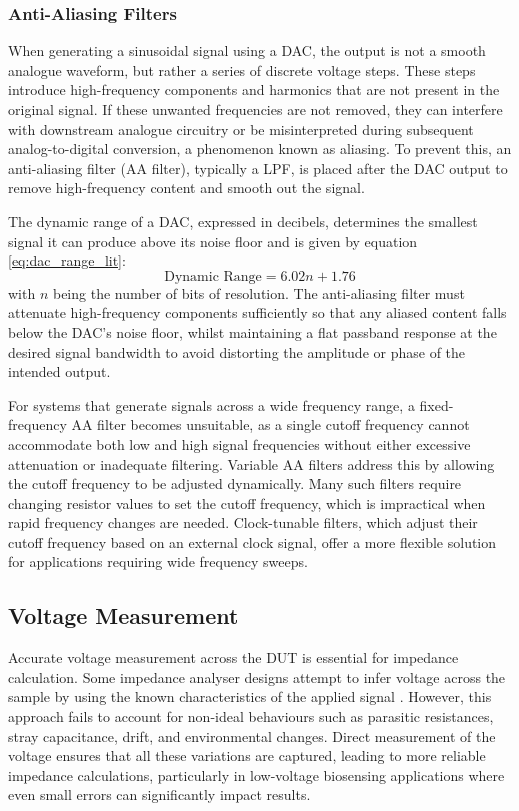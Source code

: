 \subsubsection{Anti-Aliasing Filters}
When generating a sinusoidal signal using a \ac{DAC}, the output is not a smooth analogue waveform, but rather a series of discrete voltage steps. These steps introduce high-frequency components and harmonics that are not present in the original signal. If these unwanted frequencies are not removed, they can interfere with downstream analogue circuitry or be misinterpreted during subsequent analog-to-digital conversion, a phenomenon known as aliasing. To prevent this, an anti-aliasing filter (AA filter), typically a \ac{LPF}, is placed after the DAC output to remove high-frequency content and smooth out the signal.

The dynamic range of a \ac{DAC}, expressed in decibels, determines the smallest signal it can produce above its noise floor and is given by equation \ref{eq:dac_range_lit}\cite{gaddyDYNAMICPERFORMANCETESTING}:
\begin{equation}
    \text{Dynamic Range} = 6.02n + 1.76 
    \label{eq:dac_range_lit}
\end{equation}
with $n$ being the number of bits of resolution. The anti-aliasing filter must attenuate high-frequency components sufficiently so that any aliased content falls below the DAC's noise floor, whilst maintaining a flat passband response at the desired signal bandwidth to avoid distorting the amplitude or phase of the intended output.

For systems that generate signals across a wide frequency range, a fixed-frequency AA filter becomes unsuitable, as a single cutoff frequency cannot accommodate both low and high signal frequencies without either excessive attenuation or inadequate filtering. Variable AA filters address this by allowing the cutoff frequency to be adjusted dynamically. Many such filters require changing resistor values to set the cutoff frequency, which is impractical when rapid frequency changes are needed. Clock-tunable filters, which adjust their cutoff frequency based on an external clock signal, offer a more flexible solution for applications requiring wide frequency sweeps.

\subsection{Voltage Measurement}
Accurate voltage measurement across the \ac{DUT} is essential for impedance calculation. Some impedance analyser designs attempt to infer voltage across the sample by using the known characteristics of the applied signal \cite{buscagliaSimpleZLowCostPortable2023}. However, this approach fails to account for non-ideal behaviours such as parasitic resistances, stray capacitance, drift, and environmental changes. Direct measurement of the voltage ensures that all these variations are captured, leading to more reliable impedance calculations, particularly in low-voltage biosensing applications where even small errors can significantly impact results.

